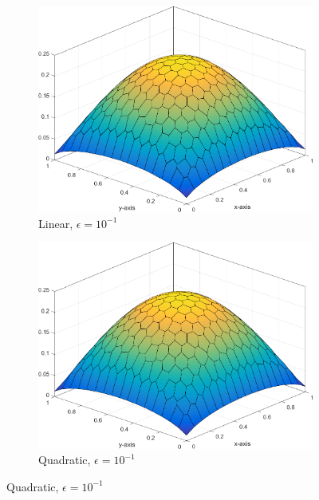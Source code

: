 \begin{figure}
\centering
{
	\begin{subfigure}[b]{0.465\textwidth}
		\centering
		\label{subfig::DL_trans_w1_e1}
		\includegraphics[width=\textwidth]{figures/sec_BF/Sq_poly_WACHSPRESS_k=1_ep=1e-1.png}
		\caption{Linear, $\epsilon = 10^{-1}$}
	\end{subfigure}
	\hfill
	\begin{subfigure}[b]{0.465\textwidth}
		\centering
		\label{subfig::DL_trans_w2_e1}
		\includegraphics[width=\textwidth]{figures/sec_BF/Sq_poly_WACHSPRESS_k=2_ep=1e-1.png}
		\caption{Quadratic, $\epsilon = 10^{-1}$}
	\end{subfigure}
}
{
	\vspace{3mm}
}
\end{figure}
